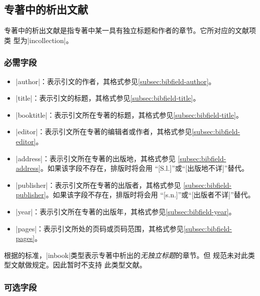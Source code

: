 \subsection{专著中的析出文献}\label{subsec:bibtype-incollection}

专著中的析出文献是指专著中某一具有独立标题和作者的章节。它所对应的{\BibTeX}文献项类
型为|incollection|。

\subsubsection{必需字段}

\begin{itemize}
\item |author|：表示引文的作者，其格式参见\ref{subsec:bibfield-author}。
\item |title|：表示引文的标题，其格式参见\ref{subsec:bibfield-title}。
\item |booktitle|：表示引文所在专著的标题，其格式参见\ref{subsec:bibfield-title}。
\item |editor|：表示引文所在专著的编辑者或作者，其格式参见\ref{subsec:bibfield-editor}。
\item |address|：表示引文所在专著的出版地，其格式参见
  \ref{subsec:bibfield-address}。如果该字段不存在，{\BibTeX}排版时将会用
  ``[S.l.]''或``[出版地不详]''替代。
\item |publisher|：表示引文所在专著的出版者，其格式参见
  \ref{subsec:bibfield-publisher}。如果该字段不存在，{\BibTeX}排版时将会用
  ``[s.n.]''或``[出版者不详]''替代。
\item |year|：表示引文所在专著的出版年，其格式参见\ref{subsec:bibfield-year}。
\item |pages|：表示引文所处的页码或页码范围，其格式参见\ref{subsec:bibfield-pages}。
\end{itemize}

\begin{note}
根据{\BibTeX}的标准，|inbook|类型表示专著中析出的\emph{无独立标题}的章节。但
规范\cite{gbt7714-2005}未对此类型文献做规定。因此暂时不支持
此类型文献。
\end{note}

\subsubsection{可选字段}

